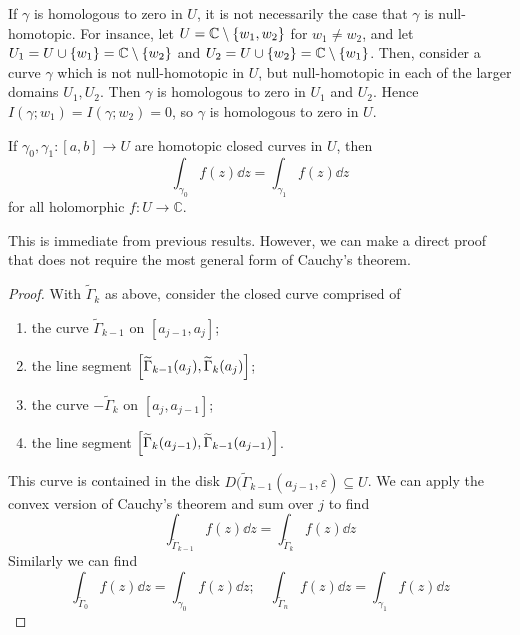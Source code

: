 \begin{remark}
	If \( \gamma \) is homologous to zero in \( U \), it is not necessarily the case that \( \gamma \) is null-homotopic.
	For insance, let \( U = \mathbb C \setminus \qty{w_1,w_2} \) for \( w_1 \neq w_2 \), and let \( U_1 = U \cup \qty{w_1} = \mathbb C \setminus \qty{w_2} \) and \( U_2 = U \cup \qty{w_2} = \mathbb C \setminus \qty{w_1} \).
	Then, consider a curve \( \gamma \) which is not null-homotopic in \( U \), but null-homotopic in each of the larger domains \( U_1, U_2 \).
	Then \( \gamma \) is homologous to zero in \( U_1 \) and \( U_2 \).
	Hence \( I(\gamma;w_1) = I(\gamma;w_2) = 0 \), so \( \gamma \) is homologous to zero in \( U \).
\end{remark}
\begin{corollary}
	If \( \gamma_0, \gamma_1 \colon [a,b] \to U \) are homotopic closed curves in \( U \), then
	\[ \int_{\gamma_0} f(z) \dd{z} = \int_{\gamma_1} f(z) \dd{z} \]
	for all holomorphic \( f \colon U \to \mathbb C \).
\end{corollary}
This is immediate from previous results.
However, we can make a direct proof that does not require the most general form of Cauchy's theorem.
\begin{proof}
	With \( \widetilde \Gamma_k \) as above, consider the closed curve comprised of
	\begin{enumerate}
		\item the curve \( \widetilde \Gamma_{k-1} \) on \( [a_{j-1}, a_j] \);
		\item the line segment \( \qty[\widetilde \Gamma_{k-1}(a_j), \widetilde \Gamma_k(a_j)] \);
		\item the curve \( - \widetilde \Gamma_{k} \) on \( [a_j, a_{j-1}] \);
		\item the line segment \( \qty[\widetilde \Gamma_k(a_{j-1}), \widetilde \Gamma_{k-1}(a_{j-1})] \).
	\end{enumerate}
	This curve is contained in the disk \( D(\widetilde \Gamma_{k-1}(a_{j-1}, \varepsilon) \subseteq U \).
	We can apply the convex version of Cauchy's theorem and sum over \( j \) to find
	\[ \int_{\widetilde \Gamma_{k-1}} f(z) \dd{z} = \int_{\widetilde \Gamma_k} f(z) \dd{z} \]
	Similarly we can find
	\[ \int_{\widetilde \Gamma_0} f(z) \dd{z} = \int_{\gamma_0} f(z) \dd{z};\quad \int_{\widetilde \Gamma_n} f(z) \dd{z} = \int_{\gamma_1} f(z) \dd{z} \]
\end{proof}

